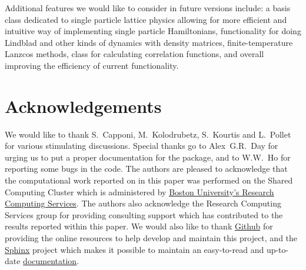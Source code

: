 \documentclass{SciPost}
\newcommand\0{\scalebox{-1}[1]{0}}
\begin{document}
Additional features we would like to consider in future versions include: a basis class dedicated to single particle lattice physics allowing for more efficient and intuitive way of implementing single particle Hamiltonians, functionality for doing Lindblad and other kinds of dynamics with density matrices, finite-temperature Lanzcos methods, class for calculating correlation functions, and overall improving the efficiency of current functionality. 
 

\section*{Acknowledgements}
We would like to thank S.~Capponi, M.~Kolodrubetz, S.~Kourtis and L.~Pollet for various stimulating discussions. Special thanks go to Alex~G.R.~Day for urging us to put a proper documentation for the package, and to W.W.~Ho for reporting some bugs in the code. The authors are pleased to acknowledge that the computational work reported on in this paper was performed on the Shared Computing Cluster which is administered by \href{http://www.bu.edu/tech/support/research/}{Boston University's Research Computing Services}. The authors also acknowledge the Research Computing Services group for providing consulting support which has contributed to the results reported within this paper. We would also like to thank \href{https://github.com/}{Github} for providing the online resources to help develop and maintain this project, and the \href{http://www.sphinx-doc.org/en/stable/#}{Sphinx} project which makes it possible to maintain an easy-to-read and up-to-date \href{http://weinbe58.github.io/QuSpin/index.html}{documentation}. 

\end{document}
